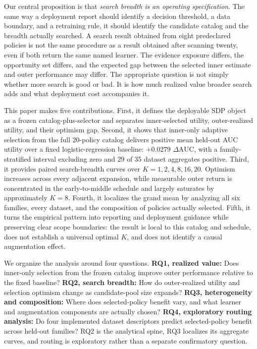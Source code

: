 \documentclass[referee]{USG}
\newcommand{\dauc}{\ensuremath{\Delta\mathrm{AUC}}}
\begin{document}
Our central proposition is that \emph{search breadth is an operating specification}. The same way a deployment report should identify a decision threshold, a data boundary, and a retraining rule, it should identify the candidate catalog and the breadth actually searched. A search result obtained from eight predeclared policies is not the same procedure as a result obtained after scanning twenty, even if both return the same named learner. The evidence exposure differs, the opportunity set differs, and the expected gap between the selected inner estimate and outer performance may differ. The appropriate question is not simply whether more search is good or bad. It is how much realized value broader search adds and what deployment cost accompanies it.

This paper makes five contributions. First, it defines the deployable SDP object as a frozen catalog-plus-selector and separates inner-selected utility, outer-realized utility, and their optimism gap. Second, it shows that inner-only adaptive selection from the full 20-policy catalog delivers positive mean held-out AUC utility over a fixed logistic-regression baseline: $+0.0279$ \dauc, with a family-stratified interval excluding zero and 29 of 35 dataset aggregates positive. Third, it provides paired search-breadth curves over $K=1,2,4,8,16,20$. Optimism increases across every adjacent expansion, while measurable outer return is concentrated in the early-to-middle schedule and largely saturates by approximately $K=8$. Fourth, it localizes the grand mean by analyzing all six families, every dataset, and the composition of policies actually selected. Fifth, it turns the empirical pattern into reporting and deployment guidance while preserving clear scope boundaries: the result is local to this catalog and schedule, does not establish a universal optimal $K$, and does not identify a causal augmentation effect.

We organize the analysis around four questions. \textbf{RQ1, realized value:} Does inner-only selection from the frozen catalog improve outer performance relative to the fixed baseline? \textbf{RQ2, search breadth:} How do outer-realized utility and selection optimism change as candidate-pool size expands? \textbf{RQ3, heterogeneity and composition:} Where does selected-policy benefit vary, and what learner and augmentation components are actually chosen? \textbf{RQ4, exploratory routing analysis:} Do four implemented dataset descriptors predict selected-policy benefit across held-out families? RQ2 is the analytical spine, RQ3 localizes its aggregate curves, and routing is exploratory rather than a separate confirmatory question.
\end{document}
